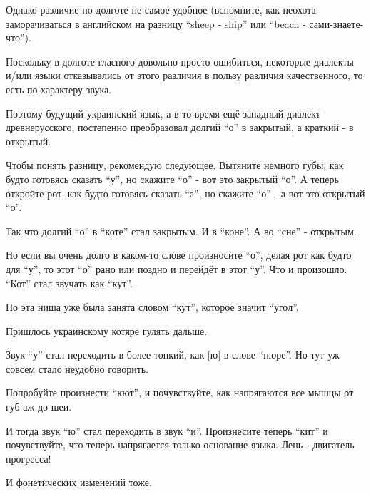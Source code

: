 Однако различие по долготе не самое удобное (вспомните, как неохота
заморачиваться в английском на разницу \enquote{sheep - ship} или \enquote{beach -
сами-знаете-что}).

Поскольку в долготе гласного довольно просто ошибиться, некоторые диалекты
и/или языки отказывались от этого различия в пользу различия качественного, то
есть по характеру звука.

Поэтому будущий украинский язык, а в то время ещё западный диалект
древнерусского, постепенно преобразовал долгий \enquote{о} в закрытый, а
краткий - в открытый.

Чтобы понять разницу, рекомендую следующее. Вытяните немного губы, как будто
готовясь сказать \enquote{у}, но скажите \enquote{о} - вот это закрытый
\enquote{о}. А теперь откройте рот, как будто готовясь сказать \enquote{а}, но
скажите \enquote{о} - а вот это открытый \enquote{о}. 

Так что долгий \enquote{о} в \enquote{коте} стал закрытым. И в \enquote{коне}.
А во \enquote{сне} - открытым.

Но если вы очень долго в каком-то слове произносите \enquote{о}, делая рот как
будто для \enquote{у}, то этот \enquote{о} рано или поздно и перейдёт в этот
\enquote{у}. Что и произошло.  \enquote{Кот} стал звучать как \enquote{кут}.

Но эта ниша уже была занята словом \enquote{кут}, которое значит
\enquote{угол}.

Пришлось украинскому котяре гулять дальше.

Звук \enquote{у} стал переходить в более тонкий, как [ю] в слове \enquote{пюре}. Но тут уж
совсем стало неудобно говорить.

Попробуйте произнести \enquote{кют}, и почувствуйте, как напрягаются все мышцы от губ
аж до шеи.

И тогда звук \enquote{ю} стал переходить в звук \enquote{и}. Произнесите теперь \enquote{кит} и
почувствуйте, что теперь напрягается только основание языка. Лень - двигатель
прогресса!

И фонетических изменений тоже.
